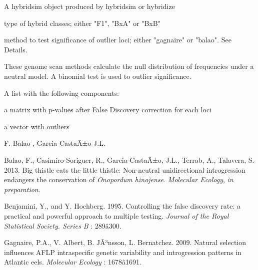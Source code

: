 \documentclass[letterpaper]{book}
\begin{document}
%
\begin{Arguments}
\begin{ldescription}
\item[\code{mat}] 
A hybridsim object produced by hybridsim or hybridize

\item[\code{type}] 
type of hybrid classes; either "F1", "BxA" or "BxB"

\item[\code{method}] 
method to test significance of outlier loci; either "gagnaire" or "balao". See Details.

\end{ldescription}
\end{Arguments}
%
\begin{Details}\relax
These genome scan methods calculate the null distribution of frequencies under a neutral model. A binomial test is used to outlier significance. 
\end{Details}
%
\begin{Value}
A list with the following components:
\begin{ldescription}
\item[\code{P-values }] a matrix with p-values after False Discovery correction for each loci
\item[\code{Outlier }] a vector with outliers
\end{ldescription}
\end{Value}
%
\begin{Author}\relax
F. Balao , Garcia-CastaÃ±o J.L.
\end{Author}
%
\begin{References}\relax
Balao, F., Casimiro-Soriguer, R., Garcia-CastaÃ±o, J.L., Terrab, A., Talavera, S. 2013. Big thistle eats the little thistle: Non-neutral unidirectional introgression endangers the conservation of \emph{Onopordum hinojense}. \emph{Molecular Ecology}, \emph{in preparation}.

Benjamini, Y., and Y. Hochberg. 1995. Controlling the false discovery rate: a practical and powerful approach to multiple testing. \emph{Journal of the Royal Statistical Society. Series B} : 289â300.

Gagnaire, P.A., V. Albert, B. JÃ³nsson, L. Bernatchez. 2009. Natural selection influences AFLP intraspecific genetic variability and introgression patterns in Atlantic eels. \emph{Molecular Ecology} : 1678â1691.

\end{References}
\end{document}
